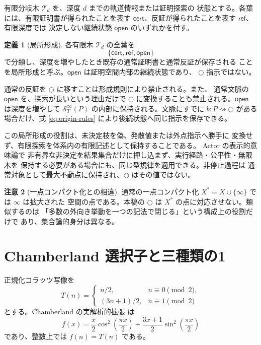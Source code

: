 \documentclass[a4paper,11pt]{ltjsarticle}
\theoremstyle{definition}
\newtheorem{definition}{定義}[section]
\newtheorem{remark}[definition]{注意}
\theoremstyle{plain}
\newcommand{\dfix}{\mathord{\text{○}}}
\newcommand{\Sinf}{\mathcal{S}^{\infty}}
\newcommand{\1}{\mathbf{1}}
\begin{document}
有限分岐木 $\mathcal{T}_d$ を、深度 $d$ までの軌道情報または証明探索の
状態とする。各葉には、有限証明書が得られたことを表す
$\mathsf{cert}$、反証が得られたことを表す $\mathsf{ref}$、有限深度では
決定しない継続状態 $\mathsf{open}$ のいずれかを付す。

\begin{definition}[局所形成]
各有限木 $\mathcal{T}_d$ の全葉を
\[
 \{\mathsf{cert},\mathsf{ref},\mathsf{open}\}
\]
で分類し、深度を増やしたとき既存の通常証明書と通常反証が保存される
ことを局所形成と呼ぶ。$\mathsf{open}$ は証明空間内部の継続状態であり、
$\dfix$ 指示ではない。
\end{definition}

通常の反証を $\dfix$ に移すことは形成規則により禁止される。また、
通常文脈の $\mathsf{open}$ を、探索が長いという理由だけで
$\dfix$ に変換することも禁止される。$\mathsf{open}$ は深度を増やして
$\Sinf_T(P)$ の内部に保持される。文脈にすでに
$b:P\rightsquigarrow\dfix$ がある場合だけ、式
\eqref{eq:origin-rules} により後続状態へ同じ指示を保存できる。

この局所形成の役割は、未決定枝を偽、発散値または外点指示へ勝手に
変換せず、有限探索を体系内の有限記述として保持することである。
Actor の表示的意味論で
非有界な非決定を結果集合だけに押し込まず、実行経路・公平性・無限木を
保持する必要がある場合にも、同じ型規律を適用できる。非停止過程は
通常対象として最大不動点に保持され、$\dfix$ はその値ではない。

\begin{remark}[一点コンパクト化との相違]
通常の一点コンパクト化 $X^*=X\cup\{\infty\}$ では $\infty$ は拡大された
空間の点である。本稿の $\dfix$ は $X^*$ の点に対応させない。類似するのは
「多数の外向き挙動を一つの記法で閉じる」という構成上の役割だけで
あり、集合論的身分は異なる。
\end{remark}

\section{Chamberland 選択子と三種類の1}

正規化コラッツ写像を
\begin{equation}\label{eq:T}
 T(n)=
 \begin{cases}
 n/2,&n\equiv0\pmod2,\\
 (3n+1)/2,&n\equiv1\pmod2
 \end{cases}
\end{equation}
とする。Chamberland の実解析的拡張 \cite{Chamberland1996} は
\begin{equation}\label{eq:chamberland}
 f(x)=\frac{x}{2}\cos^2\!\left(\frac{\pi x}{2}\right)
 +\frac{3x+1}{2}\sin^2\!\left(\frac{\pi x}{2}\right)
\end{equation}
であり、整数上では $f(n)=T(n)$ である。
\end{document}
